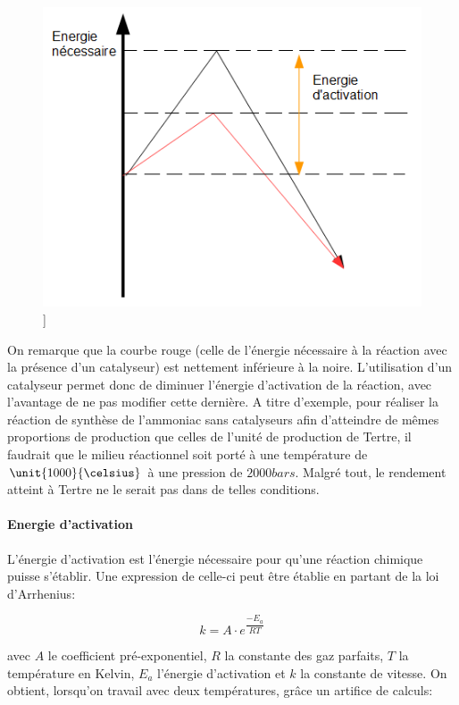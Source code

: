 \begin{figure} [h]
\begin{center}
\includegraphics[scale=0.5]{schrend}]
\end{center}
\end{figure}

On remarque que la courbe rouge (celle de l'énergie nécessaire à la réaction avec la présence d'un catalyseur) est nettement inférieure à la noire. L'utilisation d'un catalyseur permet donc de diminuer l'énergie d'activation de la réaction, avec l'avantage de ne pas modifier cette dernière. A titre d'exemple, pour réaliser la réaction de synthèse de l'ammoniac sans catalyseurs afin d'atteindre de mêmes proportions de production que celles de l'unité de production de Tertre, il faudrait que le milieu réactionnel soit porté à une température de $\unit{1000}{\celsius}$ à une pression de $\unit{2000}{bars}$. Malgré tout, le rendement atteint à Tertre ne le serait pas dans de telles conditions.

\paragraph{Energie d'activation}
L'énergie d'activation est l'énergie nécessaire pour qu'une réaction chimique puisse s'établir. Une expression de celle-ci peut être établie en partant de la loi d'Arrhenius:

$$k=A\cdot e^{\dfrac{-E_a}{RT}}$$

avec $A$ le coefficient pré-exponentiel, $R$ la constante des gaz parfaits, $T$ la température en Kelvin, $E_a$ l'énergie d'activation et $k$ la constante de vitesse.
On obtient, lorsqu'on travail avec deux températures, grâce un artifice de calculs:

